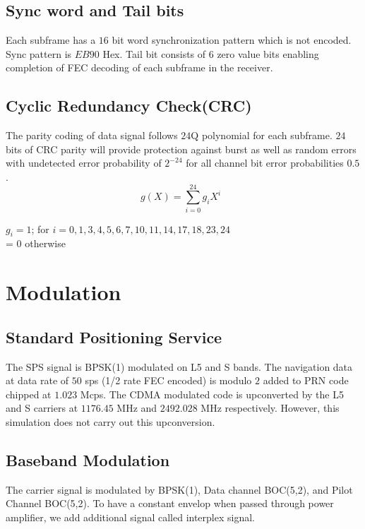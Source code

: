 \subsection{Sync word and Tail bits}
Each subframe has a $16$ bit word synchronization pattern which is not encoded. Sync pattern is $EB90$ Hex. Tail bit consists of $6$ zero value bits enabling completion of FEC decoding of each subframe in the receiver.

\subsection{Cyclic Redundancy Check(CRC)}
The parity coding of data signal follows $24$Q polynomial for each subframe. $24$ bits of CRC parity will provide protection against burst as well as random errors with undetected error probability of $2^{-24}$ for all channel bit error probabilities $0.5$.
\begin{equation}
    g(X) = \sum_{i = 0}^{24}g_{i}X^i\;\; 
\end{equation}

    $g_{i}=1$; for $i = 0,1,3,4,5,6,7,10,11,14,17,18,23,24$ \\
          = 0 otherwise

\section{Modulation}

\subsection{Standard Positioning Service}
The SPS signal is BPSK(1) modulated on L5 and S bands. The navigation data at data rate of $50$ sps (1/2 rate FEC encoded) is modulo $2$ added to PRN code chipped at $1.023$ Mcps. The CDMA modulated code is upconverted by the L5 and S carriers at $1176.45$ MHz and $2492.028$ MHz respectively. However, this simulation does not carry out this upconversion.

\subsection{Baseband Modulation}
The carrier signal is modulated by BPSK(1), Data channel BOC(5,2), and Pilot Channel BOC(5,2). To have a constant envelop when passed through power amplifier, we add additional signal called interplex signal.

